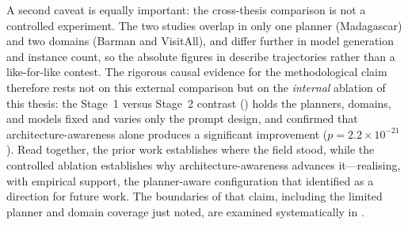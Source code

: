 A second caveat is equally important: the cross-thesis comparison is not a controlled experiment. The two studies overlap in only one planner (Madagascar) and two domains (Barman and VisitAll), and differ further in model generation and instance count, so the absolute figures in  describe trajectories rather than a like-for-like contest. The rigorous causal evidence for the methodological claim therefore rests not on this external comparison but on the \emph{internal} ablation of this thesis: the Stage~1 versus Stage~2 contrast () holds the planners, domains, and models fixed and varies only the prompt design, and  confirmed that architecture-awareness alone produces a significant improvement ($p = 2.2 \times 10^{-21}$). Read together, the prior work establishes where the field stood, while the controlled ablation establishes why architecture-awareness advances it---realising, with empirical support, the planner-aware configuration that \citeauthor{Elis2025} identified as a direction for future work. The boundaries of that claim, including the limited planner and domain coverage just noted, are examined systematically in .
